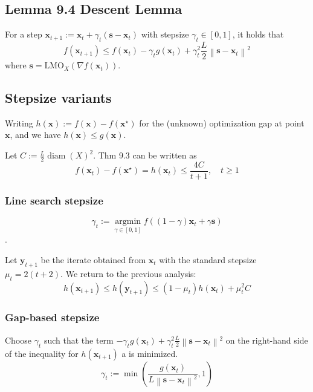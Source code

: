 \subsection*{Lemma 9.4 Descent Lemma}
For a step $\mathbf{x}_{t+1}:=\mathbf{x}_{t}+\gamma_{t}\left(\mathbf{s}-\mathbf{x}_{t}\right)$ with stepsize $\gamma_{t} \in[0,1]$, it holds that
$$
f\left(\mathbf{x}_{t+1}\right) \leq f\left(\mathbf{x}_{t}\right)-\gamma_{t} g\left(\mathbf{x}_{t}\right)+\gamma_{t}^{2} \frac{L}{2}\left\|\mathbf{s}-\mathbf{x}_{t}\right\|^{2}
$$
where $\mathbf{s}=\mathrm{LMO}_{X}\left(\nabla f\left(\mathbf{x}_{t}\right)\right)$.




\subsection*{Stepsize variants}
Writing $h(\mathbf{x}):=f(\mathbf{x})-f\left(\mathbf{x}^{\star}\right)$ for the (unknown) optimization gap at point $\mathbf{x}$, and we have $h(\mathbf{x}) \leq g(\mathbf{x})$.

Let $C:=\frac{L}{2} \operatorname{diam}(X)^{2}$. Thm 9.3 can be written as 
$$f\left(\mathbf{x}_{t}\right)-f\left(\mathbf{x}^{\star}\right)=h\left(\mathbf{x}_{t}\right) \leq \frac{4 C}{t+1}, \quad t \geq 1$$

\subsubsection*{Line search stepsize}
$$\gamma_{t}:=\underset{\gamma \in[0,1]}{\operatorname{argmin}} f\left((1-\gamma) \mathbf{x}_{t}+\gamma \mathbf{s}\right)$$.

Let $\mathbf{y}_{t+1}$ be the iterate obtained from $\mathbf{x}_{t}$ with the standard stepsize $\mu_{t}=2(t+2)$. We return to the previous analysis:
$$
h\left(\mathbf{x}_{t+1}\right) \leq h\left(\mathbf{y}_{t+1}\right) \leq\left(1-\mu_{t}\right) h\left(\mathbf{x}_{t}\right)+\mu_{t}^{2} C
$$


\subsubsection*{Gap-based stepsize}
Choose $\gamma_{t}$ such that the term $-\gamma_{t} g\left(\mathbf{x}_{t}\right)+\gamma_{t}^{2} \frac{L}{2}\left\|\mathbf{s}-\mathbf{x}_{t}\right\|^{2}$ on the right-hand side of the inequality for $h\left(\mathbf{x}_{t+1}\right)$ a is minimized.
$$
\gamma_{t}:=\min \left(\frac{g\left(\mathbf{x}_{t}\right)}{L\left\|\mathbf{s}-\mathbf{x}_{t}\right\|^{2}}, 1\right)
$$








